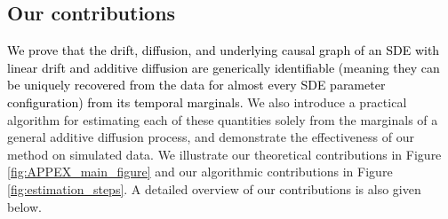 \documentclass[twoside,11pt]{article}
\newcommand{\rv}[1]{\textcolor{black}{#1}}
\begin{document}

\subsection{Our contributions}

\rv{We prove that the drift, diffusion, and underlying causal graph of an SDE with linear drift and additive diffusion are generically identifiable (meaning they can be uniquely recovered from the data for almost every SDE parameter configuration) from its temporal marginals.} We also introduce a practical algorithm for estimating each of these quantities solely from the marginals of a general additive diffusion process, and demonstrate the effectiveness of our method on simulated data.
We illustrate our theoretical contributions in Figure \ref{fig:APPEX_main_figure} and our algorithmic contributions in Figure \ref{fig:estimation_steps}. A detailed overview of our contributions is also given below. 
\end{document}
